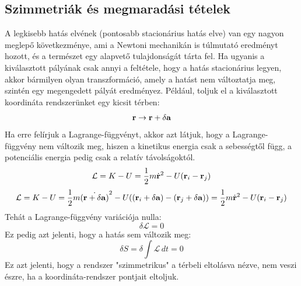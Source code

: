 \documentclass[a4paper,12pt]{article}
\begin{document}
\subsection{Szimmetriák és megmaradási tételek}
A legkisebb hatás elvének (pontosabb stacionárius hatás elve) van egy nagyon meglepő következménye, ami a Newtoni mechanikán is túlmutató eredményt hozott, és a természet egy alapvető tulajdonságát tárta fel.
Ha ugyanis a kiválasztott pályának csak annyi a feltétele, hogy a hatás stacionárius legyen, akkor bármilyen olyan transzformáció, amely a hatást nem változtatja meg, szintén egy megengedett pályát eredményez.
Például, toljuk el a kiválasztott koordináta rendszerünket egy kicsit térben:
\begin{equation}
    \bold{r} \to \bold{r} + \delta \bold{a}
\end{equation}
Ha erre felírjuk a Lagrange-függvényt, akkor azt látjuk, hogy a Lagrange-függvény nem változik meg, hiszen a kinetikus energia csak a sebességtől függ, a potenciális energia pedig csak a relatív távolságoktól.
\begin{equation}
    \mathcal{L} = K - U = \frac{1}{2}m \dot{\bold{r}}^2 - U(\bold{r}_i - \bold{r}_j)
\end{equation}
\begin{equation}
    \mathcal{L} = K - U = \frac{1}{2}m \dot{(\bold{r} + \delta \bold{a})}^2 - U((\bold{r}_i + \delta \bold{a}) - (\bold{r}_j + \delta \bold{a})) = \frac{1}{2}m \dot{\bold{r}}^2 - U(\bold{r}_i - \bold{r}_j)
\end{equation}
Tehát a Lagrange-függvény variációja nulla:
\begin{equation}
    \delta \mathcal{L} = 0
\end{equation}
Ez pedig azt jelenti, hogy a hatás sem változik meg:
\begin{equation}
    \delta S = \delta \int \mathcal{L} \, dt = 0
\end{equation}
Ez azt jelenti, hogy a rendszer "szimmetrikus" a térbeli eltolásva nézve, nem veszi észre, ha a koordináta-rendszer pontjait eltoljuk. 
\end{document}
